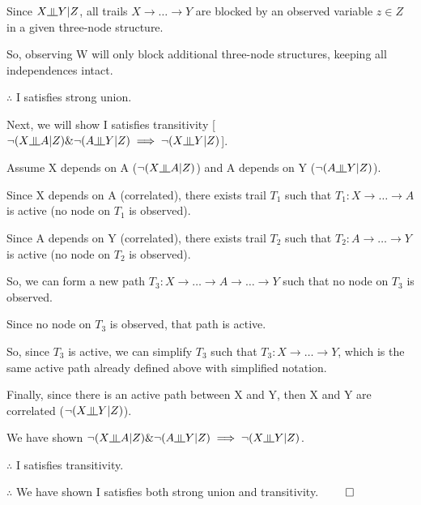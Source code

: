 \documentclass[12pt]{article}
\newcommand{\indep}{\rotatebox[origin=c]{90}{$\models$}}
\begin{document}
Since $X \indep Y \vert Z$, all trails $X \rightarrow \dots \rightarrow Y$ are blocked by an observed variable $z \in Z$ in a given three-node structure.

So, observing W will only block additional three-node structures, keeping all independences intact.

$\therefore$ I satisfies strong union.

Next, we will show I satisfies transitivity [$\neg(X \indep A \vert Z) \& \neg(A \indep Y \vert Z) \implies \neg(X \indep Y \vert Z)$].

Assume X depends on A ($\neg(X \indep A \vert Z)$) and A depends on Y ($\neg(A \indep Y \vert Z)$).

Since X depends on A (correlated), there exists trail $T_1$ such that $T_1 : X \rightarrow \dots \rightarrow A$ is active (no node on $T_1$ is observed).

Since A depends on Y (correlated), there exists trail $T_2$ such that $T_2 : A \rightarrow \dots \rightarrow Y$ is active (no node on $T_2$ is observed).

So, we can form a new path $T_3 : X \rightarrow \dots \rightarrow A \rightarrow \dots \rightarrow Y$ such that no node on $T_3$ is observed.

Since no node on $T_3$ is observed, that path is active.

So, since $T_3$ is active, we can simplify $T_3$ such that $T_3 : X \rightarrow \dots \rightarrow Y$, which is the same active path already defined above with simplified notation.

Finally, since there is an active path between X and Y, then X and Y are correlated ($\neg(X \indep Y \vert Z)$).

We have shown $\neg(X \indep A \vert Z) \& \neg(A \indep Y \vert Z) \implies \neg(X \indep Y \vert Z)$. 

$\therefore$ I satisfies transitivity.

$\therefore$ We have shown I satisfies both strong union and transitivity. $\qed$
\end{document}
